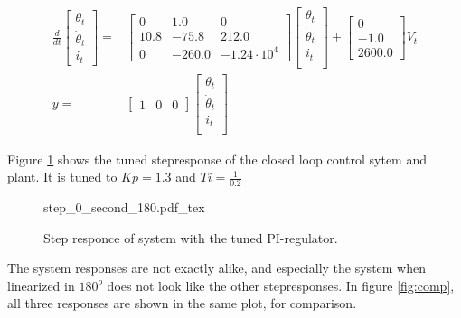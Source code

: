 \documentclass[../../../Main]{subfiles}
\begin{document}
\begin{equation}
      \label{eq:180_linearized}
      \begin{split}
      \frac{d}{dt}
    \begin{bmatrix}
        \theta_t \\
        \dot \theta_t \\
        i_t
    \end{bmatrix}
    =&
    \begin{bmatrix}0 & 1.0 & 0\\ 10.8 & -75.8 & 212.0\\ 0 & -260.0 & -1.24\cdot10^4 \end{bmatrix}
    \begin{bmatrix}
        \theta_t \\
        \dot \theta_t \\
        i_t \\
    \end{bmatrix}
    +
    \begin{bmatrix}
    0\\ -1.0\\ 2600.0
    \end{bmatrix}
    V_t
\\
      y =&
    \begin{bmatrix}
        1 & 0 & 0
    \end{bmatrix}
    \begin{bmatrix}
        \theta_t \\
        \dot \theta_t\\
        i_t\\
    \end{bmatrix}
    \end{split}
\end{equation}


Figure \ref{fig:step_0_second_180} shows the tuned stepresponse of the closed loop control sytem and plant.
It is tuned to $Kp = 1.3$ and $Ti = \frac{1}{0.2}$
\begin{figure}[H]
\centering
\def\svgwidth{\textwidth}
{step_0_second_180.pdf_tex}
\caption{Step responce of system with the tuned PI-regulator.}
\label{fig:step_0_second_180}
\end{figure}

The system responses are not exactly alike, and especially the system when linearized in $180^o$ does not look like the other stepresponses. In figure \ref{fig:comp}, all three responses are shown in the same plot, for comparison.
\end{document}
